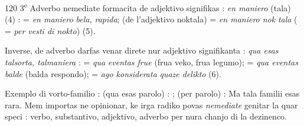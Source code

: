 \begin{VUpage}[124]{120}
3\textsuperscript{e} Adverbo nemediate formacita de adjektivo signifikas :\nl
\textit{en maniero} (tala) (4) :  = \textit{en maniero bela,}\nl
\textit{rapida};  (de l'adjektivo noktala) = \textit{en maniero nok}\cc
\textit{tala} ( = \textit{per vesti di nokto}) (5).

Inverse, de adverbo darfas venar direte nur adjektivo\nl
signifikanta : \textit{qua esas talsorta, talmaniera} :  = \textit{qua}\nl
\textit{eventas frue} (frua veko, frua legumo);  = \textit{qua eventas}\nl
\textit{balde} (balda respondo);  = \textit{ago konsiderata}\nl
\textit{quaze delikto} (6).

Exemplo di vorto-familio :  (qua\nl
esas parolo) : ;  (per parolo) : \cc
{} Ma tala familii esas rara. Mem importas ne\nl
opinionar, ke irga radiko povas \textit{nemediate} genitar la quar\nl
speci : verbo, substantivo, adjektivo, adverbo per nura chanjo\nl
di la dezinenco.
\end{VUpage}

